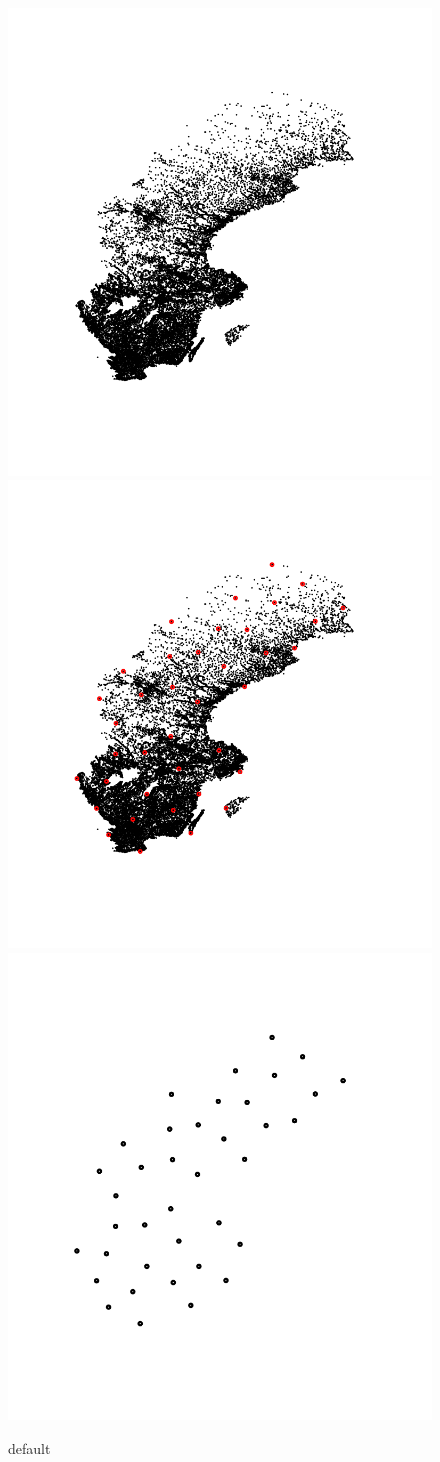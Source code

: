 \begin{figure}[htp]

\centering
\includegraphics[width=.3\textwidth]{swe1.png}\hfill
\includegraphics[width=.3\textwidth]{swe2.png}\hfill
\includegraphics[width=.3\textwidth]{swe3.png}

\caption{default}
\label{fig:figure3}

\end{figure}